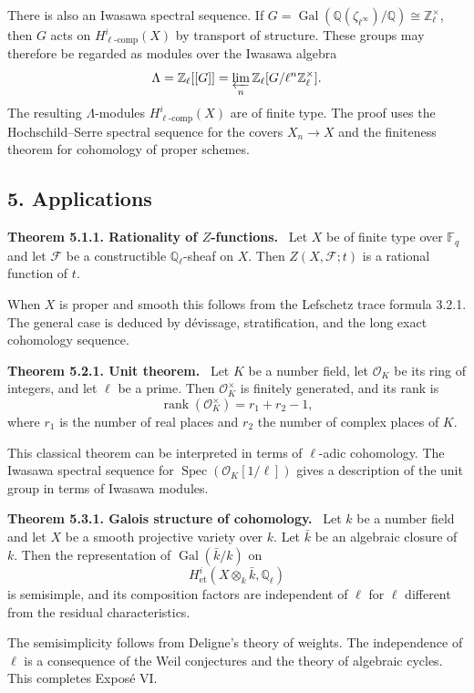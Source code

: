 \documentclass[12pt]{article}
\newcommand{\bZ}{\mathbb Z}
\newcommand{\bQ}{\mathbb Q}
\newcommand{\bF}{\mathbb F}
\newcommand{\cF}{\mathcal F}
\newcommand{\cO}{\mathcal O}
\newcommand{\Spec}{\operatorname{Spec}}
\newcommand{\Gal}{\operatorname{Gal}}
\newenvironment{statement}[1]{\par\medskip\noindent\textbf{#1.}\ }{\par\medskip}
\begin{document}
There is also an Iwasawa spectral sequence. If
$G=\Gal(\bQ(\zeta_{\ell^\infty})/\bQ)\cong\bZ_\ell^\times$, then $G$ acts on
$H^i_{\ell\text{-}\mathrm{comp}}(X)$ by transport of structure. These groups may
therefore be regarded as modules over the Iwasawa algebra
\[
      \Lambda=\bZ_\ell[[G]]=
      \varprojlim_n\bZ_\ell[G/\ell^n\bZ_\ell^\times].
\]
The resulting $\Lambda$-modules $H^i_{\ell\text{-}\mathrm{comp}}(X)$ are of finite
type. The proof uses the Hochschild--Serre spectral sequence for the covers
$X_n\to X$ and the finiteness theorem for cohomology of proper schemes.

\subsection*{5. Applications}

\begin{statement}{Theorem 5.1.1. Rationality of $Z$-functions}
Let $X$ be of finite type over $\bF_q$ and let $\cF$ be a constructible
$\bQ_\ell$-sheaf on $X$. Then $Z(X,\cF;t)$ is a rational function of $t$.
\end{statement}

When $X$ is proper and smooth this follows from the Lefschetz trace formula 3.2.1.
The general case is deduced by dévissage, stratification, and the long exact
cohomology sequence.

\begin{statement}{Theorem 5.2.1. Unit theorem}
Let $K$ be a number field, let $\cO_K$ be its ring of integers, and let $\ell$ be a
prime. Then $\cO_K^\times$ is finitely generated, and its rank is
\[
       \operatorname{rank}(\cO_K^\times)=r_1+r_2-1,
\]
where $r_1$ is the number of real places and $r_2$ the number of complex places of
$K$.
\end{statement}

This classical theorem can be interpreted in terms of $\ell$-adic cohomology. The
Iwasawa spectral sequence for $\Spec(\cO_K[1/\ell])$ gives a description of the unit
group in terms of Iwasawa modules.

\begin{statement}{Theorem 5.3.1. Galois structure of cohomology}
Let $k$ be a number field and let $X$ be a smooth projective variety over $k$. Let
$\bar k$ be an algebraic closure of $k$. Then the representation of
$\Gal(\bar k/k)$ on
\[
      H^i_{\mathrm{et}}(X\otimes_k\bar k,\bQ_\ell)
\]
is semisimple, and its composition factors are independent of $\ell$ for $\ell$
different from the residual characteristics.
\end{statement}

The semisimplicity follows from Deligne's theory of weights. The independence of
$\ell$ is a consequence of the Weil conjectures and the theory of algebraic cycles.
This completes Exposé VI.

\bigskip
\end{document}
